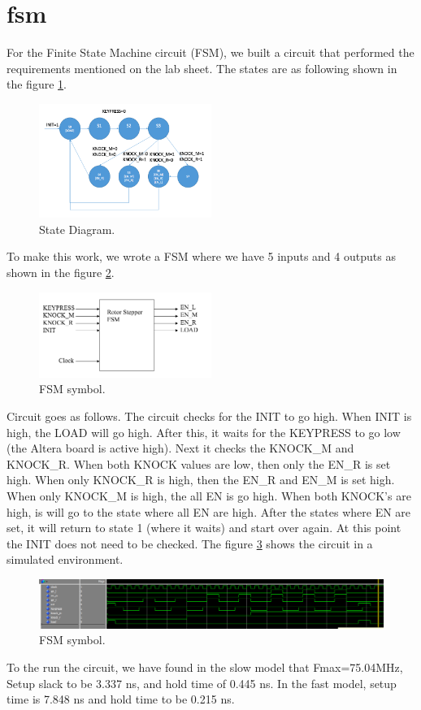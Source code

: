 \documentclass[10pt]{article}
\begin{document}
\section{fsm}
For the Finite State Machine circuit (FSM), we built a circuit that performed the requirements mentioned on the lab sheet. The states are as following shown in the figure \ref{fig:state_diagram}.
\begin{figure}[!htb]
    \centering
    \includegraphics[width=0.5\textwidth]{./state_diagram.png}
    \caption{State Diagram.}
    \label{fig:state_diagram}
\end{figure}
To make this work, we wrote a FSM where we have 5 inputs and 4 outputs as shown in the figure \ref{fig:FSM}.
\begin{figure}[!htb]
    \centering
    \includegraphics[width=0.5\textwidth]{./FSM.png}
    \caption{FSM symbol.}
    \label{fig:FSM}
\end{figure}
Circuit goes as follows. The circuit checks for the INIT to go high. When INIT is high, the LOAD will go high. After this, it waits for the KEYPRESS to go low (the Altera board is active high). Next it checks the KNOCK\_M and KNOCK\_R. When both KNOCK values are low, then only the EN\_R is set high. When only KNOCK\_R is high, then the EN\_R and EN\_M is set high. When only KNOCK\_M is high, the all EN is go high. When both KNOCK's are high, is will go to the state where all EN are high. After the states where EN are set, it will return to state 1 (where it waits) and start over again. At this point the INIT does not need to be checked. The figure \ref{fig:fsm_test} shows the circuit in a simulated environment.
\begin{figure}[!htb]
    \centering
    \includegraphics[width=1\textwidth]{./fsm_test.png}
    \caption{FSM symbol.}
    \label{fig:fsm_test}
\end{figure}
To the run the circuit, we have found in the slow model that Fmax=75.04MHz, Setup slack to be 3.337 ns, and hold time of 0.445 ns. In the fast model, setup time is 7.848 ns and hold time to be 0.215 ns.
\end{document}
